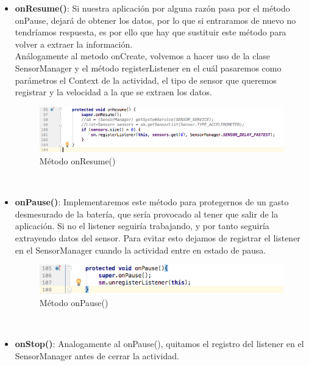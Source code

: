 \documentclass[12pt, a4paper, titlepage]{article}
\begin{document}
\begin{itemize}
		\item \textbf{onResume()}: Si nuestra aplicación por alguna razón pasa por el método onPause, dejará de obtener los datos, por lo que si entraramos de nuevo no tendríamos respuesta, es por ello que hay que sustituir este método para volver a extraer la información.\newline\\
		Análogamente al metodo onCreate, volvemos a hacer uso de la clase SensorManager y el método registerListener en el cuál pasaremos como parámetros el Context de la actividad, el tipo de sensor que queremos registrar y la velocidad a la que se extraen los datos.
		\begin{figure}[h!]
			\begin{center}
				\includegraphics[scale=0.55]{img/onResume.png}
				\caption{Método onResume()}
			\end{center}
		\end{figure}\\
		\item \textbf{onPause()}: Implementaremos este método para protegernos de un gasto desmesurado de la batería, que sería provocado al tener que salir de la aplicación. Si no el listener seguiría trabajando, y por tanto seguiría extrayendo datos del sensor. Para evitar esto dejamos de registrar el listener en el SensorManager cuando la actividad entre en estado de pausa.\newline\\
		\begin{figure}[h!]
			\begin{center}
				\includegraphics[scale=0.55]{img/onPause.png}
				\caption{Método onPause()}
			\end{center}
		\end{figure}\\
		\item \textbf{onStop()}: Analogamente al onPause(), quitamos el registro del listener en el SensorManager antes de cerrar la actividad.\newline\\

\end{itemize}
\end{document}
